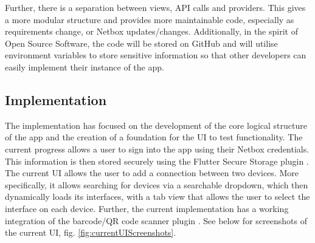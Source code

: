 \documentclass [11pt,a4paper]{article}
\begin{document}
Further, there is a separation between views, API calls and providers. This gives a more modular structure and provides more maintainable code, especially as requirements change, or Netbox updates/changes. Additionally, in the spirit of Open Source Software, the code will be stored on GitHub \cite{keeptrackgithub} and will utilise environment variables to store sensitive information so that other developers can easily implement their instance of the app.

\subsection{Implementation}
\label{sec:implementation}
The implementation has focused on the development of the core logical structure of the app and the creation of a foundation for the UI to test functionality. The current progress allows a user to sign into the app using their Netbox credentials. This information is then stored securely using the Flutter Secure Storage plugin \cite{securestorage}. The current UI allows the user to add a connection between two devices. More specifically, it allows searching for devices via a searchable dropdown, which then dynamically loads its interfaces, with a tab view that allows the user to select the interface on each device. Further, the current implementation has a working integration of the barcode/QR code scanner plugin \cite{barcodeScannerPlugin}. See below for screenshots of the current UI, fig. \ref{fig:currentUIScreenshots}. 
\end{document}

